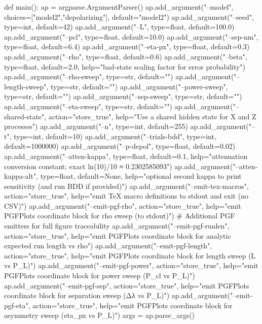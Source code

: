 {{{{def main():
    ap = argparse.ArgumentParser()
    ap.add_argument("--model", choices=["model2","depolarizing"], default="model2")
    ap.add_argument("--seed", type=int, default=42)
    ap.add_argument("--L", type=float, default=100.0)
    ap.add_argument("--pcl", type=float, default=10.0)
    ap.add_argument("--sep-nm", type=float, default=6.4)
    ap.add_argument("--eta-px", type=float, default=0.3)
    ap.add_argument("--rho", type=float, default=0.6)
    ap.add_argument("--beta", type=float, default=2.0,
                    help="bad-state scaling factor for error probability")
    ap.add_argument("--rho-sweep", type=str, default="")
    ap.add_argument("--length-sweep", type=str, default="")
    ap.add_argument("--power-sweep", type=str, default="")
    ap.add_argument("--sep-sweep", type=str, default="")
    ap.add_argument("--eta-sweep", type=str, default="")
    ap.add_argument("--shared-state", action="store_true",
                    help="Use a shared hidden state for X and Z processes")
    ap.add_argument("--n", type=int, default=255)
    ap.add_argument("--t", type=int, default=10)
    ap.add_argument("--trials-bdd", type=int, default=1000000)
    ap.add_argument("--p-depol", type=float, default=0.02)
    ap.add_argument("--atten-kappa", type=float, default=0.1,
                    help="attenuation conversion constant; exact ln(10)/10 ≈ 0.2302585093")
    ap.add_argument("--atten-kappa-alt", type=float, default=None,
                    help="optional second kappa to print sensitivity (and run BDD if provided)")
    ap.add_argument("--emit-tex-macros", action="store_true",
                    help="emit TeX macro definitions to stdout and exit (no CSV)")
    ap.add_argument("--emit-pgf-rho", action="store_true",
                    help="emit PGFPlots coordinate block for rho sweep (to stdout)")
    # Additional PGF emitters for full figure traceability
    ap.add_argument("--emit-pgf-runlen", action="store_true",
                    help="emit PGFPlots coordinate block for analytic expected run length vs rho")
    ap.add_argument("--emit-pgf-length", action="store_true",
                    help="emit PGFPlots coordinate block for length sweep (L vs P_L)")
    ap.add_argument("--emit-pgf-power", action="store_true",
                    help="emit PGFPlots coordinate block for power sweep (P_cl vs P_L)")
    ap.add_argument("--emit-pgf-sep", action="store_true",
                    help="emit PGFPlots coordinate block for separation sweep (Δλ vs P_L)")
    ap.add_argument("--emit-pgf-eta", action="store_true",
                    help="emit PGFPlots coordinate block for asymmetry sweep (eta_px vs P_L)")
    args = ap.parse_args()

}}}}
